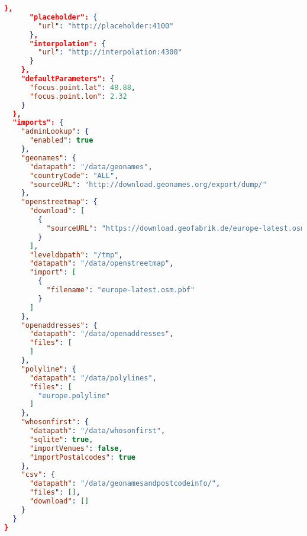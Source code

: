 \begin{lstlisting}[language=json,breaklines=true]
      },
      "placeholder": {
        "url": "http://placeholder:4100"
      },
      "interpolation": {
        "url": "http://interpolation:4300"
      }
    },
    "defaultParameters": {
      "focus.point.lat": 48.88,
      "focus.point.lon": 2.32
    }
  },
  "imports": {
    "adminLookup": {
      "enabled": true
    },
    "geonames": {
      "datapath": "/data/geonames",
      "countryCode": "ALL",
      "sourceURL": "http://download.geonames.org/export/dump/"
    },
    "openstreetmap": {
      "download": [
        {
          "sourceURL": "https://download.geofabrik.de/europe-latest.osm.pbf"
        }
      ],
      "leveldbpath": "/tmp",
      "datapath": "/data/openstreetmap",
      "import": [
        {
          "filename": "europe-latest.osm.pbf"
        }
      ]
    },
    "openaddresses": {
      "datapath": "/data/openaddresses",
      "files": [
      ]
    },
    "polyline": {
      "datapath": "/data/polylines",
      "files": [
        "europe.polyline"
      ]
    },
    "whosonfirst": {
      "datapath": "/data/whosonfirst",
      "sqlite": true,
      "importVenues": false,
      "importPostalcodes": true
    },
    "csv": {
      "datapath": "/data/geonamesandpostcodeinfo/",
      "files": [],
      "download": []
    }
  }
}
\end{lstlisting}

